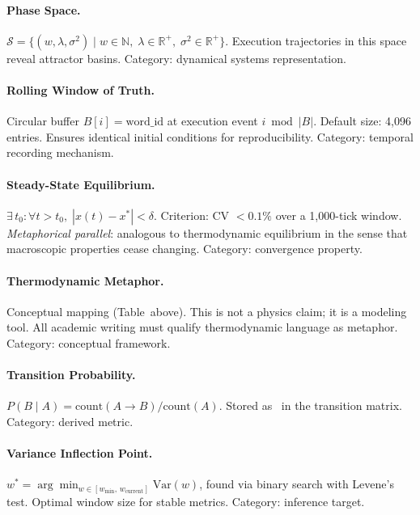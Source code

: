 \paragraph{Phase Space.}
$\mathcal{S} = \{(w, \lambda, \sigma^2) \mid w \in \mathbb{N},\;
\lambda \in \mathbb{R}^+,\; \sigma^2 \in \mathbb{R}^+\}$.
Execution trajectories in this space reveal attractor basins.
Category: dynamical systems representation.

\paragraph{Rolling Window of Truth.}
Circular buffer $B[i] = \text{word\_id}$ at execution event $i \bmod |B|$.
Default size: 4{,}096 entries. Ensures identical initial conditions for
reproducibility. Category: temporal recording mechanism.

\paragraph{Steady-State Equilibrium.}
$\exists\, t_0\colon \forall t > t_0,\; |x(t) - x^*| < \delta$.
Criterion: CV $< 0.1\%$ over a 1{,}000-tick window.
\emph{Metaphorical parallel}: analogous to thermodynamic equilibrium
in the sense that macroscopic properties cease changing.
Category: convergence property.

\paragraph{Thermodynamic Metaphor.}
Conceptual mapping (Table~above). This is not a physics claim; it is a
modeling tool. All academic writing must qualify thermodynamic language
as metaphor. Category: conceptual framework.

\paragraph{Transition Probability.}
$P(B \mid A) = \text{count}(A \to B) / \text{count}(A)$. Stored as
\Qtype\ in the transition matrix. Category: derived metric.

\paragraph{Variance Inflection Point.}
$w^* = \arg\min_{w \in [w_{\min},\, w_{\text{current}}]} \text{Var}(w)$,
found via binary search with Levene's test. Optimal window size for stable
metrics. Category: inference target.


